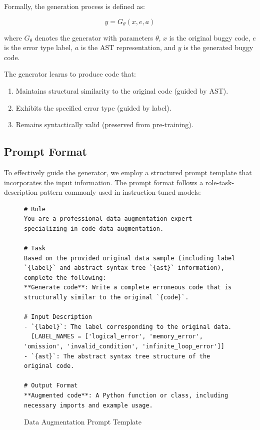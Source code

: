 Formally, the generation process is defined as:

\begin{equation}
y = G_{\theta}(x, e, a)
\end{equation}

where $G_{\theta}$ denotes the generator with parameters $\theta$, $x$ is the original buggy code, $e$ is the error type label, $a$ is the AST representation, and $y$ is the generated buggy code.

The generator learns to produce code that:
\begin{enumerate}
    \item Maintains structural similarity to the original code (guided by AST).
    \item Exhibits the specified error type (guided by label).
    \item Remains syntactically valid (preserved from pre-training).
\end{enumerate}

\subsection{Prompt Format}

To effectively guide the generator, we employ a structured prompt template that incorporates the input information. The prompt format follows a role-task-description pattern commonly used in instruction-tuned models:

\begin{figure}[h]
\begin{lstlisting}
# Role
You are a professional data augmentation expert specializing in code data augmentation.

# Task
Based on the provided original data sample (including label `{label}` and abstract syntax tree `{ast}` information), complete the following:
**Generate code**: Write a complete erroneous code that is structurally similar to the original `{code}`.

# Input Description
- `{label}`: The label corresponding to the original data.
  [LABEL_NAMES = ['logical_error', 'memory_error', 'omission', 'invalid_condition', 'infinite_loop_error']]
- `{ast}`: The abstract syntax tree structure of the original code.

# Output Format
**Augmented code**: A Python function or class, including necessary imports and example usage.
\end{lstlisting}
\caption{Data Augmentation Prompt Template}
\label{fig:prompt_template}
\end{figure}

